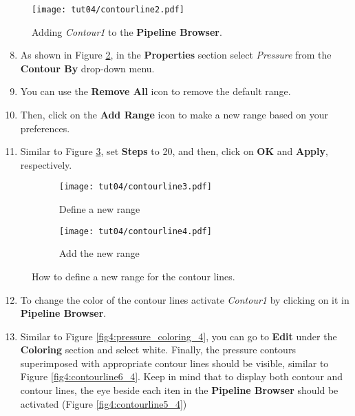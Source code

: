 \begin{figure}[ht]
    \centering
    \texttt{[image: tut04/contourline2.pdf]}
    \caption{Adding \textit{Contour1} to the \textbf{Pipeline Browser}.}
    \label{fig4:contourline2_4}
\end{figure}
\begin{enumerate}[label=\arabic*)]
	\setcounter{enumi}{7}
	\item As shown in Figure \ref{fig4:contourby_4 a}, in the \textbf{Properties} section select \textit{Pressure} from the \textbf{Contour By} drop-down menu.
	\item You can use the \textbf{Remove All} icon to remove the default range.
	\item Then, click on the \textbf{Add Range} icon to make a new range based on your preferences.
	\item Similar to Figure \ref{fig4:contourby_4 b}, set \textbf{Steps} to 20, and then, click on \textbf{OK} and \textbf{Apply}, respectively.
\end{enumerate}
\begin{figure}[ht]
    \centering
    \begin{subfigure}[b]{.4\textwidth}
        \centering
        \texttt{[image: tut04/contourline3.pdf]}
        \caption{Define a new range}
        \label{fig4:contourby_4 a}
    \end{subfigure}
    \hfill
    \begin{subfigure}[b]{.4\textwidth}
        \centering
        \texttt{[image: tut04/contourline4.pdf]}
        \caption{Add the new range}
        \label{fig4:contourby_4 b}
    \end{subfigure}     
    \caption{How to define a new range for the contour lines.}
    \label{fig4:contourby_4}
\end{figure}
\begin{enumerate}[label=\arabic*)]
	\setcounter{enumi}{11}
	\item To change the color of the contour lines activate \textit{Contour1} by clicking on it in \textbf{Pipeline Browser}.
	\item Similar to Figure \ref{fig4:pressure_coloring_4}, you can go to \textbf{Edit} under the \textbf{Coloring} section and select white. Finally, the pressure contours superimposed with appropriate contour lines should be visible, similar to Figure \ref{fig4:contourline6_4}. Keep in mind that to display both contour and contour lines, the eye beside each iten in the \textbf{Pipeline Browser} should be activated (Figure \ref{fig4:contourline5_4})
\end{enumerate}
